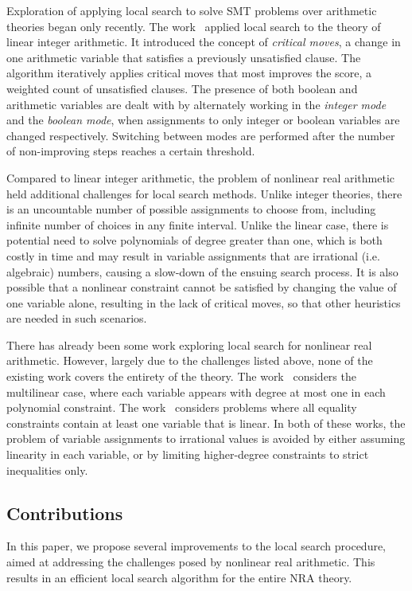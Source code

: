 \documentclass[runningheads]{llncs}
\begin{document}
Exploration of applying local search to solve SMT problems over arithmetic theories began only recently. The work~\cite{CaiLZ22} applied local search to the theory of linear integer arithmetic. It introduced the concept of \emph{critical moves}, a change in one arithmetic variable that satisfies a previously unsatisfied clause. The algorithm iteratively applies critical moves that most improves the score, a weighted count of unsatisfied clauses. The presence of both boolean and arithmetic variables are dealt with by alternately working in the \emph{integer mode} and the \emph{boolean mode}, when assignments to only integer or boolean variables are changed respectively. Switching between modes are performed after the number of non-improving steps reaches a certain threshold.

Compared to linear integer arithmetic, the problem of nonlinear real arithmetic held additional challenges for local search methods. Unlike integer theories, there is an uncountable number of possible assignments to choose from, including infinite number of choices in any finite interval. Unlike the linear case, there is potential need to solve polynomials of degree greater than one, which is both costly in time and may result in variable assignments that are irrational (i.e. algebraic) numbers, causing a slow-down of the ensuing search process. It is also possible that a nonlinear constraint cannot be satisfied by changing the value of one variable alone, resulting in the lack of critical moves, so that other heuristics are needed in such scenarios.

There has already been some work exploring local search for nonlinear real arithmetic. However, largely due to the challenges listed above, none of the existing work covers the entirety of the theory. The work~\cite{abs-2303-06676} considers the multilinear case, where each variable appears with degree at most one in each polynomial constraint. The work~\cite{LiXZ23} considers problems where all equality constraints contain at least one variable that is linear. In both of these works, the problem of variable assignments to irrational values is avoided by either assuming linearity in each variable, or by limiting higher-degree constraints to strict inequalities only.

\subsection{Contributions}

In this paper, we propose several improvements to the local search procedure, aimed at addressing the challenges posed by nonlinear real arithmetic. This results in an efficient local search algorithm for the entire NRA theory.
\end{document}
